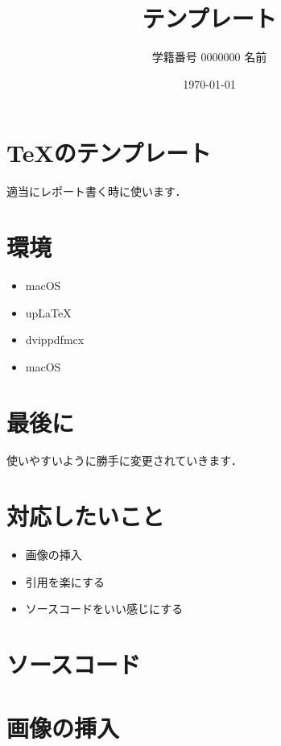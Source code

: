 \documentclass[uplatex,dvipdfmx]{jsarticle}
\title{テンプレート}
\author{学籍番号 0000000 名前}
\date{\today}
\begin{document}
\maketitle

\section{TeXのテンプレート}
適当にレポート書く時に使います．

\section{環境}
\begin{itemize}
    \item macOS
    \item upLaTeX
    \item dvippdfmcx
    \item macOS
\end{itemize}

\section{最後に}
使いやすいように勝手に変更されていきます．

\section{対応したいこと}
\begin{itemize}
    \item 画像の挿入
    \item 引用を楽にする
    \item ソースコードをいい感じにする
\end{itemize}

\section{ソースコード}


\section{画像の挿入}

\end{document}
